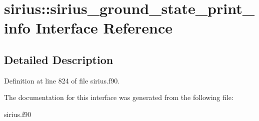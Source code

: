 \hypertarget{interfacesirius_1_1sirius__ground__state__print__info}{}\section{sirius\+:\+:sirius\+\_\+ground\+\_\+state\+\_\+print\+\_\+info Interface Reference}
\label{interfacesirius_1_1sirius__ground__state__print__info}


\subsection{Detailed Description}


Definition at line 824 of file sirius.\+f90.



The documentation for this interface was generated from the following file\+:\begin{DoxyCompactItemize}
\item 
sirius.\+f90\end{DoxyCompactItemize}
